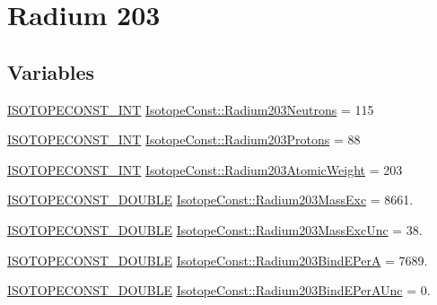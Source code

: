 \hypertarget{group___isotope_const-_radium-_ra203}{}\section{Radium 203}
\label{group___isotope_const-_radium-_ra203}
\subsection*{Variables}
\begin{DoxyCompactItemize}
\item 
\mbox{\hyperlink{group___isotope_const-_macros_ga5f18360b3e99483a35c32d789e62621c}{I\+S\+O\+T\+O\+P\+E\+C\+O\+N\+S\+T\+\_\+\+I\+NT}} \mbox{\hyperlink{group___isotope_const-_radium-_ra203_ga5df074728c7808f4f94a46da9e8b55a8}{Isotope\+Const\+::\+Radium203\+Neutrons}} = 115
\item 
\mbox{\hyperlink{group___isotope_const-_macros_ga5f18360b3e99483a35c32d789e62621c}{I\+S\+O\+T\+O\+P\+E\+C\+O\+N\+S\+T\+\_\+\+I\+NT}} \mbox{\hyperlink{group___isotope_const-_radium-_ra203_gaec9701da7a508f607cb411e53552ce87}{Isotope\+Const\+::\+Radium203\+Protons}} = 88
\item 
\mbox{\hyperlink{group___isotope_const-_macros_ga5f18360b3e99483a35c32d789e62621c}{I\+S\+O\+T\+O\+P\+E\+C\+O\+N\+S\+T\+\_\+\+I\+NT}} \mbox{\hyperlink{group___isotope_const-_radium-_ra203_ga699b26893a7ca64596c13fb8e3b24e52}{Isotope\+Const\+::\+Radium203\+Atomic\+Weight}} = 203
\item 
\mbox{\hyperlink{group___isotope_const-_macros_ga8f45a7272ce02c0b4c65c44636ed719a}{I\+S\+O\+T\+O\+P\+E\+C\+O\+N\+S\+T\+\_\+\+D\+O\+U\+B\+LE}} \mbox{\hyperlink{group___isotope_const-_radium-_ra203_ga7412c249c351b1e46cfb7b7f56925bec}{Isotope\+Const\+::\+Radium203\+Mass\+Exc}} = 8661.
\item 
\mbox{\hyperlink{group___isotope_const-_macros_ga8f45a7272ce02c0b4c65c44636ed719a}{I\+S\+O\+T\+O\+P\+E\+C\+O\+N\+S\+T\+\_\+\+D\+O\+U\+B\+LE}} \mbox{\hyperlink{group___isotope_const-_radium-_ra203_ga9e62b74a3f75053f7ce30156845f6537}{Isotope\+Const\+::\+Radium203\+Mass\+Exc\+Unc}} = 38.
\item 
\mbox{\hyperlink{group___isotope_const-_macros_ga8f45a7272ce02c0b4c65c44636ed719a}{I\+S\+O\+T\+O\+P\+E\+C\+O\+N\+S\+T\+\_\+\+D\+O\+U\+B\+LE}} \mbox{\hyperlink{group___isotope_const-_radium-_ra203_gada70641f84d1529d76d41cce6acb675b}{Isotope\+Const\+::\+Radium203\+Bind\+E\+PerA}} = 7689.
\item 
\mbox{\hyperlink{group___isotope_const-_macros_ga8f45a7272ce02c0b4c65c44636ed719a}{I\+S\+O\+T\+O\+P\+E\+C\+O\+N\+S\+T\+\_\+\+D\+O\+U\+B\+LE}} \mbox{\hyperlink{group___isotope_const-_radium-_ra203_ga3e1892ef2e0c8fafe263097045546651}{Isotope\+Const\+::\+Radium203\+Bind\+E\+Per\+A\+Unc}} = 0.

\end{DoxyCompactItemize}
